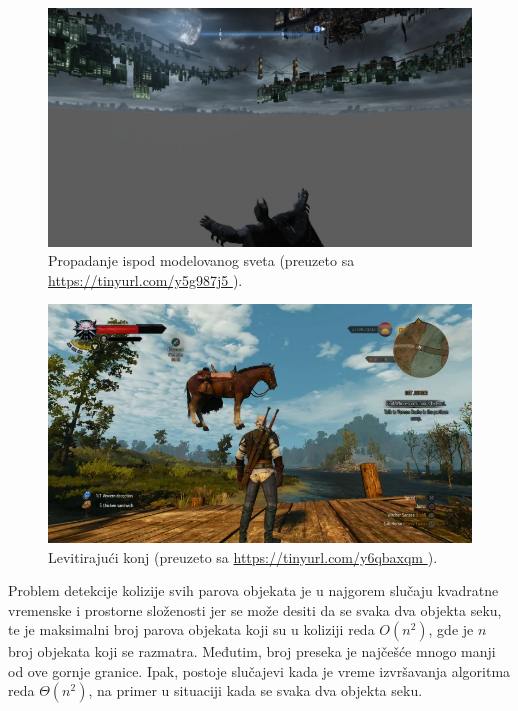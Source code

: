 \documentclass[12pt,oneside]{memoir}
\begin{document}
\begin{figure}
\centering
\includegraphics[scale=0.22]{batman.jpg}
\caption{Propadanje ispod modelovanog sveta (\tiny preuzeto sa \url{ https://tinyurl.com/y5g987j5 }).}
\label{fig:batman}
\end{figure}


\begin{figure}
	\centering
	\includegraphics[scale=0.54]{horse.png}
	\caption{Levitirajući konj (\tiny preuzeto sa \url{ https://tinyurl.com/y6qbaxqm }).}
	
	\label{fig:horse}
\end{figure}

Problem detekcije kolizije svih parova objekata je u najgorem slučaju kvadratne vremenske i prostorne složenosti 
jer se može desiti da se svaka dva objekta seku, te je maksimalni broj parova objekata koji su u koliziji reda $O(n^2)$, 
gde je $n$ broj objekata koji se razmatra.
Međutim, broj preseka je najčešće mnogo manji od ove gornje granice.
Ipak, postoje slučajevi kada je vreme izvršavanja algoritma reda $\Theta(n^2)$, na primer u situaciji kada se svaka dva objekta seku.
\end{document}
